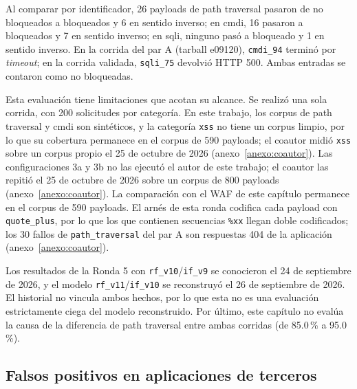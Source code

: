 Al comparar por identificador, 26 payloads de path traversal pasaron de no bloqueados a bloqueados y 6 en sentido inverso; en cmdi, 16 pasaron a bloqueados y 7 en sentido inverso; en sqli, ninguno pasó a bloqueado y 1 en sentido inverso. En la corrida del par A (tarball e09120\textellipsis{}), \texttt{cmdi\_94} terminó por \textit{timeout}; en la corrida validada, \texttt{sqli\_75} devolvió HTTP 500. Ambas entradas se contaron como no bloqueadas.

Esta evaluación tiene limitaciones que acotan su alcance. Se realizó una sola corrida, con 200 solicitudes por categoría. En este trabajo, los corpus de path traversal y cmdi son sintéticos, y la categoría \texttt{xss} no tiene un corpus limpio, por lo que su cobertura permanece en el corpus de 590 payloads; el coautor midió \texttt{xss} sobre un corpus propio el 25 de octubre de 2026 (anexo~\ref{anexo:coautor}). Las configuraciones 3a y 3b no las ejecutó el autor de este trabajo; el coautor las repitió el 25 de octubre de 2026 sobre un corpus de 800 payloads (anexo~\ref{anexo:coautor}). La comparación con el WAF de este capítulo permanece en el corpus de 590 payloads. El arnés de esta ronda codifica cada payload con \texttt{quote\_plus}, por lo que los que contienen secuencias \texttt{\%xx} llegan doble codificados; los 30 fallos de \texttt{path\_traversal} del par A son respuestas 404 de la aplicación (anexo~\ref{anexo:coautor}).

Los resultados de la Ronda 5 con \texttt{rf\_v10}/\texttt{if\_v9} se conocieron el 24 de septiembre de 2026, y el modelo \texttt{rf\_v11}/\texttt{if\_v10} se reconstruyó el 26 de septiembre de 2026. El historial no vincula ambos hechos, por lo que esta no es una evaluación estrictamente ciega del modelo reconstruido. Por último, este capítulo no evalúa la causa de la diferencia de path traversal entre ambas corridas (de 85.0\,\% a 95.0\,\%).

\subsection{Falsos positivos en aplicaciones de terceros}\label{sec:falsos-positivos}

